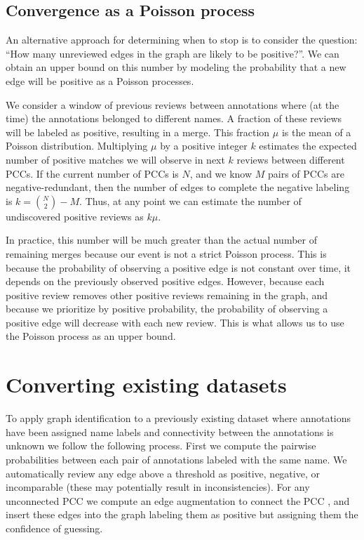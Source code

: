 \subsection{Convergence as a Poisson process}

An alternative approach for determining when to stop is to consider the question: ``How many unreviewed edges in the
graph are likely to be positive?''. We can obtain an upper bound on this number by modeling the probability that a new
edge will be positive as a Poisson processes.

We consider a window of previous reviews between annotations where (at the time) the annotations belonged to different
names. A fraction of these reviews will be labeled as positive, resulting in a merge. This fraction $\mu$ is the mean of
a Poisson distribution. Multiplying $\mu$ by a positive integer $k$ estimates the expected number of positive matches we
will observe in next $k$ reviews between different PCCs. If the current number of PCCs is $N$, and we know $M$ pairs of
PCCs are negative-redundant, then the number of edges to complete the negative labeling is $k=\binom{N}{2} - M$. Thus,
at any point we can estimate the number of undiscovered positive reviews as $k\mu$.

In practice, this number will be much greater than the actual number of remaining merges because our event is not a
strict Poisson process. This is because the probability of observing a positive edge is not constant over time, it
depends on the previously observed positive edges. However, because each positive review removes other positive reviews
remaining in the graph, and because we prioritize by positive probability, the probability of observing a positive edge
will decrease with each new review. This is what allows us to use the Poisson process as an upper bound.



\section{Converting existing datasets}\label{sec:rename}
To apply graph identification to a previously existing dataset where annotations have been assigned name labels and
connectivity between the annotations is unknown we follow the following process. First we compute the pairwise
probabilities between each pair of annotations labeled with the same name. We automatically review any edge above a
threshold as positive, negative, or incomparable (these may potentially result in inconsistencies). For any unconnected
PCC we compute an edge augmentation to connect the PCC \cite{eswaran_augmentation_1976,khuller_approximation_1993}, and
insert these edges into the graph labeling them as positive but assigning them the confidence of guessing.

